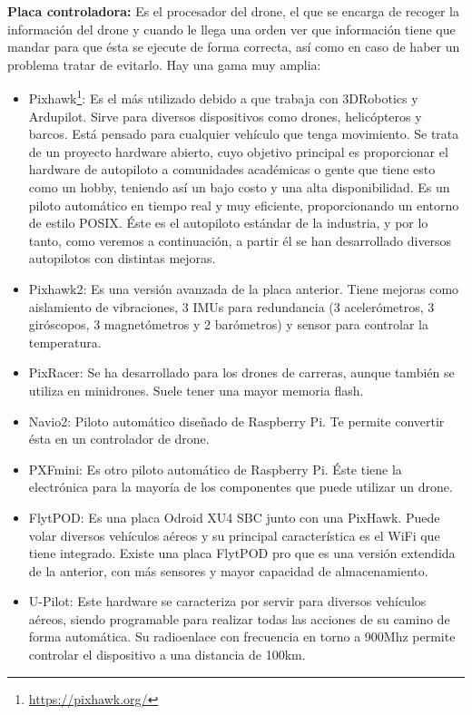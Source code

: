 \hspace{1 cm}\textbf{Placa controladora:} Es el procesador del drone, el que se encarga de recoger la informaci\'on del drone y cuando le llega una orden ver que informaci\'on tiene que mandar para que \'esta se ejecute de forma correcta, as\'i como en caso de haber un problema tratar de evitarlo. Hay una gama muy amplia:
	\begin{itemize}
		\item Pixhawk\footnote{\url{https://pixhawk.org/}}: Es el m\'as utilizado debido a que trabaja con 3DRobotics y Ardupilot. Sirve para diversos dispositivos como drones, helic\'opteros y barcos. Est\'a pensado para cualquier veh\'iculo que tenga movimiento. Se trata de un proyecto hardware abierto, cuyo objetivo principal es proporcionar el hardware de autopiloto a comunidades acad\'emicas o gente que tiene esto como un hobby, teniendo as\'i un bajo costo y una alta disponibilidad. Es un piloto autom\'atico en tiempo real y muy eficiente, proporcionando un entorno de estilo POSIX. \'Este es el autopiloto est\'andar de la industria, y por lo tanto, como veremos a continuaci\'on, a partir \'el se han desarrollado diversos autopilotos con distintas mejoras. 

		\item Pixhawk2: Es una versi\'on avanzada de la placa anterior. Tiene mejoras como aislamiento de vibraciones, 3 IMUs para redundancia (3 aceler\'ometros, 3 gir\'oscopos, 3 magnet\'ometros y 2 bar\'ometros) y sensor para controlar la temperatura. 

		\item PixRacer: Se ha desarrollado para los drones de carreras, aunque tambi\'en se utiliza en minidrones. Suele tener una mayor memoria flash.

		\item Navio2: Piloto autom\'atico diseñado de Raspberry Pi. Te permite convertir \'esta en un controlador de drone. 

		\item PXFmini: Es otro piloto autom\'atico de Raspberry Pi. \'Este tiene la electr\'onica para la mayor\'ia de los componentes que puede utilizar un drone. 

		\item FlytPOD: Es una placa Odroid XU4 SBC junto con una PixHawk. Puede volar diversos veh\'iculos a\'ereos y su principal caracter\'istica es el WiFi que tiene integrado. Existe una placa FlytPOD pro que es una versi\'on extendida de la anterior, con m\'as sensores y mayor capacidad de almacenamiento. 

		\item U-Pilot: Este hardware se caracteriza por servir para diversos veh\'iculos a\'ereos, siendo programable para realizar todas las acciones de su camino de forma autom\'atica. Su radioenlace con frecuencia en torno a 900Mhz permite controlar el dispositivo a una distancia de 100km. 
	\end{itemize}

